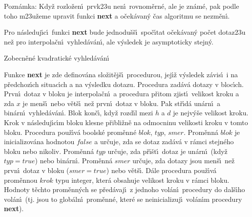 \documentclass[a4paper,12pt]{article}
\begin{document}
\flushpar Pozn\'amka: Kdy\v z rozlo\v zen\'\i\ prvk\accent23u nen\'\i\ 
rovnom\v ern\'e, ale je zn\'a\-m\'e, pak podle toho m\accent23u\v zeme  
upravit funkci {\bf next} a o\v cek\'avan\'y \v cas algoritmu se 
nezm\v en\'\i .
\medskip

\flushpar Pro n\'asleduj\'\i c\'\i\ funkci {\bf next} bude 
jednodu\v s\v s\'\i\ spo\v c\'\i tat o\v cek\'ava\-n\'y po\v cet dotaz\accent23u ne\v z 
pro interpola\v cn\'\i\ vyhled\'av\'an\'\i , ale v\'ysledek je 
asymptoticky stejn\'y.

\subhead
Zobecn\v en\'e kvadratick\'e vyhled\'av\'an\'\i
\endsubhead

\flushpar Funkce {\bf next }
je zde definov\'ana slo\v zit\v ej\v s\'\i\ procedurou, jej\'\i\v z v\'y\-sle\-dek 
z\'avis\'\i\ i na p\v redcho\-z\'\i ch situac\'\i ch a na v\'ysledku dotazu.
Procedura zad\'av\'a dotazy v bloc\'\i ch. Prvn\'\i\ dotaz v bloku je 
interpola\v cn\'\i\ a procedura p\v ritom zjist\'\i\ velikost kroku a 
zda $x$ je men\v s\'\i\ nebo v\v et\v s\'\i\ ne\v z prvn\'\i\ dotaz v bloku.  
Pak st\v r\'\i d\'a un\'arn\'\i\ a bin\'arn\'\i\ vy\-hled\'av\'an\'\i . Blok kon\v c\'\i , 
kdy\v z rozd\'\i l mezi $h$ a $d$ je nejv\'y\v se velikost 
kroku. Krok v n\'asleduj\'\i c\'\i m bloku klesne 
p\v ribli\v zn\v e na odmoc\-ninu velikosti kroku v tomto bloku. 
Procedura pou\v z\'\i v\'a boolsk\'e pro\-m\v enn\'e $blok$, $typ$, $
smer$. 
Prom\v enn\'a $blok$ je inicializov\'ana hodnotou $false$ a ur\v cuje, 
zda se dotaz zad\'av\'a v r\'amci stejn\'eho bloku nebo nikoliv. 
Prom\v enn\'a $typ$ ur\v cuje, zda p\v r\'\i\v st\'\i\ dotaz je un\'arn\'\i\ (kdy\v z 
$typ=true$) nebo bin\'arn\'\i . Prom\v enn\'a $smer$ ur\v cuje, zda 
dotazy jsou men\v s\'\i\ ne\v z prvn\'\i\ dotaz v bloku ($smer=tr
ue$) 
nebo v\v et\v s\'\i . D\'ale procedura pou\v z\'\i v\'a prom\v ennou $
krok$ 
typu integer, kter\'a obsahuje velikost kroku v r\'amci 
bloku. Hodnoty t\v echto pro\-m\v en\-n\'ych se p\v red\'avaj\'\i\ z jednoho 
vol\'an\'\i\ procedury do dal\v s\'\i ho vol\'an\'\i\ (tj. jsou to 
glob\'aln\'\i\ prom\v enn\'e, kter\'e se neinicializuj\'\i\ vol\'an\'\i m 
procedury {\bf next}). 
\medskip
\end{document}
